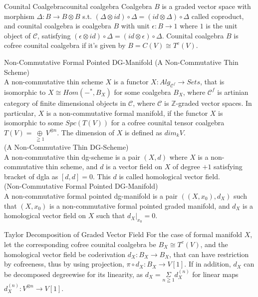 \documentclass{article}
\begin{document}
\begin{definition}{Counital Coalgebra}{counital coalgebra}
Coalgebra $B$ is a graded vector space with morphism $\Delta:B\to B\otimes B$ s.t. 
$(\Delta \otimes id)\circ \Delta = (id \otimes \Delta)\circ \Delta$ called coproduct,
and counital coalgebra is coalgebra $B$ with unit $\epsilon:B\to 1$ where $1$ is the unit object of $\mathcal{C}$,
satisfying $(\epsilon \otimes id)\circ \Delta = (id \otimes \epsilon)\circ \Delta$.
Counital coalgebra $B$ is cofree counital coalgebra if it's given by $B=C(V)\cong T^c(V)$.
\end{definition}


\begin{definition}{Non-Commutative Formal Pointed DG-Manifold}{}
(A Non-Commutative Thin Scheme)\\
A non-commutative thin scheme $X$ is a functor $X:Alg_{\mathcal{C}^f} \to Sets$, that is isomorphic to $X\cong Hom(-^*, B_X)$
for some coalgebra $B_X$, where $\mathcal{C}^f$ is artinian category of finite dimensional objects in $\mathcal{C}$, 
where $\mathcal{C}$ is $\mathbb{Z}$-graded vector spaces.
In particular, $X$ is a non-commutative formal manifold, if the functor $X$ is isomorphic to some $Spc(T(V))$
for a cofree counital tensor coalgebra $T(V)=\underset{\geqq 1}{\oplus}V^{\otimes n}$. The dimension of $X$ is defined as $dim_k V$. \\

(A Non-Commutative Thin DG-Scheme)\\
A non-commutative thin dg-scheme is a pair $(X,d)$ where $X$ is a non-commutative thin scheme, and $d$ is a vector field on $X$
of degree $+1$ satisfying bracket of dgla as $[d,d]=0$. This $d$ is called homological vector field. \\

(Non-Commutative Formal Pointed DG-Manifold) \\
A non-commutative formal pointed dg-manifold is a pair $((X, x_0), d_X)$ such that $(X, x_0)$ 
is a non-commutative formal pointed graded manifold, and $d_X$ is a homological vector field on $X$ such that $d_X|_{x_0} = 0$. 
\end{definition}


\begin{proposition}{Taylor Decomposition of Graded Vector Field}{}
For the case of formal manifold $X$, let the corresponding cofree counital coalgebra be $B_X\cong T^c(V)$,
and the homological vector field be coderivation $d_X:B_X\to B_X$, that can have restriction by cofreeness, thus by using projection,
$\pi \circ d_X:B_X\to V[1]$. If in addition, $d_X$ can be decomposed degreewise for its linearity,
as $d_X = \underset{n\geqq 1}{\Sigma} d_X^{(n)}$ for linear maps $d_X^{(n)}:V^{\otimes n}\to V[1]$.
\end{proposition}
\end{document}
